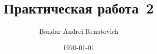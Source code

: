\documentclass[14pt,a4paper,oneside]{extreport}
\author{Bondar Andrei Renatovich}
\title{Практическая работа \No\,2}
\date{\today}
\begin{document}
\renewcommand{\figurename}{Рисунок}
\renewcommand{\contentsname}{Содержание}


\tableofcontents



\end{document}
